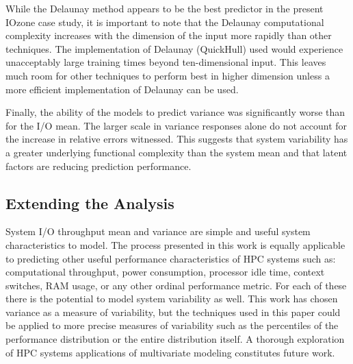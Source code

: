 \documentclass{scspaperproc}
\theoremstyle{scsthe}
\begin{document}
While the Delaunay method appears to be the best predictor in the
present IOzone case study, it is important to note that the Delaunay
computational complexity increases with the dimension of the input
more rapidly than other techniques. The implementation of Delaunay
(QuickHull) used would experience unacceptably large training times
beyond ten-dimensional input. This leaves much room for other
techniques to perform best in higher dimension unless a more efficient
implementation of Delaunay can be used.

Finally, the ability of the models to predict variance was
significantly worse than for the I/O mean. The larger scale in
variance responses alone do not account for the increase in relative
errors witnessed. This suggests that system variability has a greater
underlying functional complexity than the system mean and that latent
factors are reducing prediction performance.

\vspace{-10pt}
\subsection{Extending the Analysis}
\vspace{-10pt}
System I/O throughput mean and variance are simple and useful system
characteristics to model. The process presented in this work is
equally applicable to predicting other useful performance
characteristics of HPC systems such as: computational throughput,
power consumption, processor idle time, context switches, RAM usage,
or any other ordinal performance metric. For each of these there is
the potential to model system variability as well. This work has
chosen variance as a measure of variability, but the techniques used
in this paper could be applied to more precise measures of variability
such as the percentiles of the performance distribution or the entire
distribution itself. A thorough exploration of HPC systems
applications of multivariate modeling constitutes future work.

\end{document}
